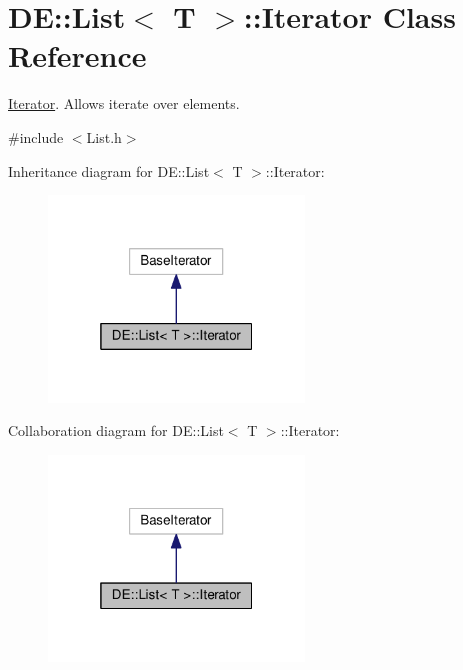 \hypertarget{classDE_1_1List_1_1Iterator}{}\section{DE\+:\+:List$<$ T $>$\+:\+:Iterator Class Reference}
\label{classDE_1_1List_1_1Iterator}


\hyperlink{classDE_1_1List_1_1Iterator}{Iterator}. Allows iterate over elements.  




{\ttfamily \#include $<$List.\+h$>$}



Inheritance diagram for DE\+:\+:List$<$ T $>$\+:\+:Iterator\+:\nopagebreak
\begin{figure}[H]
\begin{center}
\leavevmode
\includegraphics[width=193pt]{classDE_1_1List_1_1Iterator__inherit__graph}
\end{center}
\end{figure}


Collaboration diagram for DE\+:\+:List$<$ T $>$\+:\+:Iterator\+:\nopagebreak
\begin{figure}[H]
\begin{center}
\leavevmode
\includegraphics[width=193pt]{classDE_1_1List_1_1Iterator__coll__graph}
\end{center}
\end{figure}
